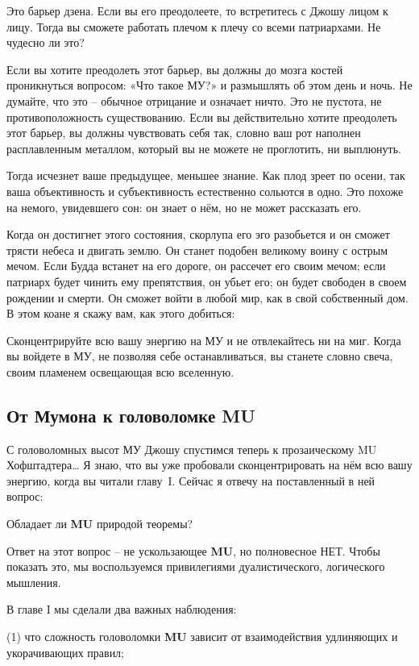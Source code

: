 \documentclass[../main.tex]{subfiles}
\begin{document}
Это барьер дзена. Если вы его преодолеете, то встретитесь с Джошу лицом к лицу. Тогда вы сможете работать плечом к плечу со всеми патриархами. Не чудесно ли это?

Если вы хотите преодолеть этот барьер, вы должны до мозга костей проникнуться вопросом: «Что такое МУ?» и размышлять об этом день и ночь. Не думайте, что это \--- обычное отрицание и означает ничто. Это не пустота, не противоположность существованию. Если вы действительно хотите преодолеть этот барьер, вы должны чувствовать себя так, словно ваш рот наполнен расплавленным металлом, который вы не можете не проглотить, ни выплюнуть.

Тогда исчезнет ваше предыдущее, меньшее знание. Как плод зреет по осени, так ваша объективность и субъективность естественно сольются в одно. Это похоже на немого, увидевшего сон: он знает о нём, но не может рассказать его.

Когда он достигнет этого состояния, скорлупа его эго разобьется и он сможет трясти небеса и двигать землю. Он станет подобен великому воину с острым мечом. Если Будда встанет на его дороге, он рассечет его своим мечом; если патриарх будет чинить ему препятствия, он убьет его; он будет свободен в своем рождении и смерти. Он сможет войти в любой мир, как в свой собственный дом. В этом коане я скажу вам, как этого добиться:

Сконцентрируйте всю вашу энергию на МУ и не отвлекайтесь ни на миг. Когда вы войдете в МУ, не позволяя себе останавливаться, вы станете словно свеча, своим пламенем освещающая всю вселенную.


\subsection{От Мумона к головоломке MU}

С головоломных высот МУ Джошу спустимся теперь к прозаическому MU Хофштадтера\ldots{} Я знаю, что вы уже пробовали сконцентрировать на нём всю вашу энергию, когда вы читали главу~I\@. Сейчас я отвечу на поставленный в ней вопрос:

Обладает ли \textbf{MU} природой теоремы?

Ответ на этот вопрос \--- не ускользающее \textbf{MU}, но полновесное НЕТ\@. Чтобы показать это, мы воспользуемся привилегиями дуалистического, логического мышления.

В главе I мы сделали два важных наблюдения:

(1) что сложность головоломки \textbf{MU} зависит от взаимодействия удлиняющих и укорачивающих правил;
\end{document}
